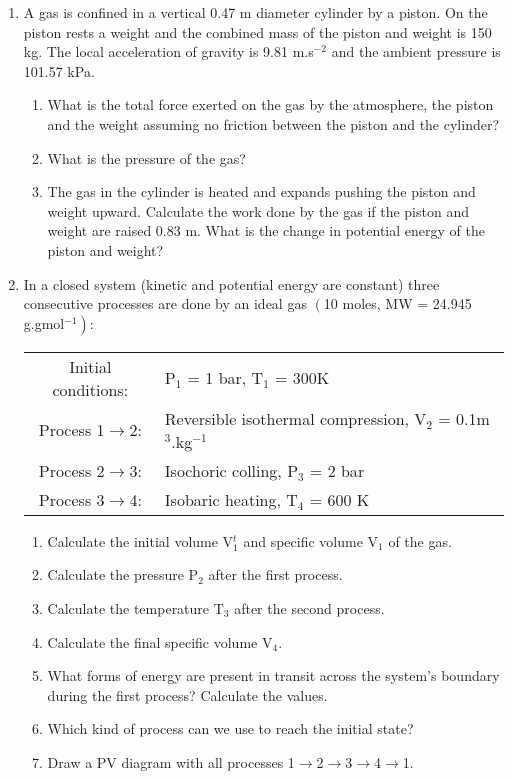 \documentclass[12pts,a4paper,amsmath,amssymb,floatfix]{article}%
\begin{document}
\begin{enumerate}[label=\bfseries Problem \arabic*:]

\item\label{Tut02:CylinderPiston1}A gas is confined in a vertical 0.47 m diameter cylinder by a piston. On the piston rests a weight and the combined mass of the piston and weight is 150 kg. The local acceleration of gravity is 9.81 m.s$^{-2}$ and the ambient pressure is 101.57 kPa.
\begin{enumerate}
\item What is the total force exerted on the gas by the atmosphere, the piston and the weight assuming no friction between the piston and the cylinder?
\item What is the pressure of the gas? 
\item The gas in the cylinder is heated and expands pushing the piston and weight upward. Calculate the work done by the gas if the piston and weight are raised 0.83 m. What is the change in potential energy of the piston and weight?
\end{enumerate}

\item\label{Tut02:IdealGas1}In a closed system (kinetic and potential energy are constant) three consecutive processes are done by an ideal gas $\left(\right.$10 moles, MW = 24.945 g.gmol$\left.^{-1}\right)$:
\begin{center}
\begin{tabular}{c l}
\hline
Initial conditions: & P$_{1}$ = 1 bar, T$_{1}$ = 300K \\
Process 1$\rightarrow$2: & Reversible isothermal compression, V$_{2}$ = 0.1m$^{3}$.kg$^{-1}$ \\
Process 2$\rightarrow$3: & Isochoric colling, P$_{3}$ = 2 bar \\
Process 3$\rightarrow$4: & Isobaric heating, T$_{4}$ = 600 K \\
\hline
\end{tabular}
\end{center}
\begin{enumerate}
\item Calculate the initial volume V$^{t}_{1}$ and specific volume V$_{1}$ of the gas.%
\item Calculate the pressure P$_{2}$ after the first process. %
\item Calculate the temperature T$_{3}$ after the second process.%
\item Calculate the final specific volume V$_{4}$. %
\item What forms of energy are present in transit across the system's boundary during the first process? Calculate the values. %
\item Which kind of process can we use to reach the initial state?
\item Draw a PV diagram with all processes 1$\rightarrow$2$\rightarrow$3$\rightarrow$4$\rightarrow$1.
\end{enumerate}



\end{enumerate}
\end{document}
